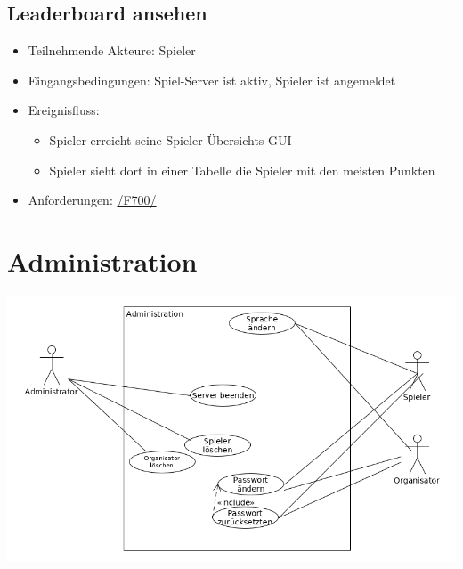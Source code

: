 \documentclass[a4paper]{scrreprt}
\begin{document}
    \subsection{Leaderboard ansehen}
    \begin{itemize}
        \item Teilnehmende Akteure: \Gls{Spieler}
        \item Eingangsbedingungen: \Gls{Spiel-Server} ist aktiv, \Gls{Spieler} ist angemeldet
        \item Ereignisfluss:
        \begin{itemize}
            \item \Gls{Spieler} erreicht seine Spieler-Übersichts-GUI
            \item \Gls{Spieler} sieht dort in einer Tabelle die \Gls{Spieler} mit den meisten Punkten
        \end{itemize}
        \item Anforderungen: \hyperlink{F700}{/F700/}
    \end{itemize}

    \newpage
    \section{Administration}
    \includegraphics[width=\textwidth]{uml/export/Administration.png}
\end{document}
